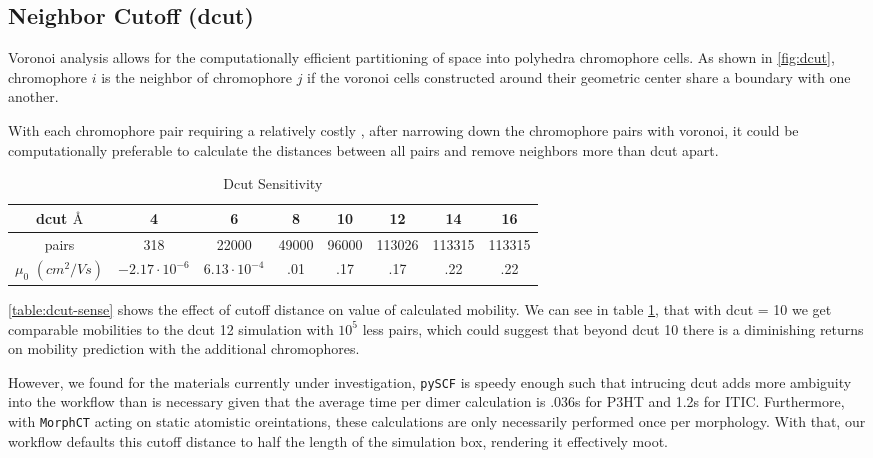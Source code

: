 \subsection{Neighbor Cutoff (dcut)}
\label{dcutresults}
Voronoi analysis allows for the computationally efficient partitioning of space into
polyhedra chromophore cells. As shown in \ref{fig:dcut}, chromophore $i$ is the neighbor of chromophore $j$
if the voronoi cells constructed around their geometric center
share a boundary with one another. 

With each chromophore pair requiring a relatively costly , after narrowing down the chromophore pairs with voronoi, it
could be
computationally preferable to calculate the distances between all pairs and remove neighbors more than dcut
apart.

\begin{table}
\caption{Dcut Sensitivity}
\centering %
\begin{tabular}{c c c c c c c c} %
\hline\hline %
    dcut $\text{\AA}$ & 4 & 6 & 8 & 10 & 12 & 14 & 16 \\ [0.5ex] %
\hline  %
pairs & 318 & 22000 & 49000 & 96000 & 113026 & 113315 & 113315 \\ [1ex]%
$\mu_{0}$ $(cm^{2}/Vs)$ & $-2.17 \cdot 10^{-6}$ & $6.13 \cdot 10^{-4}$ & .01 & .17 & .17 & .22 & .22 \\ [1ex] %
\hline %
\end{tabular}
\label{table:dcut-sense} %
\end{table}

\autoref{table:dcut-sense} shows the effect of cutoff distance on value of
calculated mobility.  
 We can see in table \ref{table:dcut-sense}, that with dcut = 10 we get comparable mobilities to the
dcut 12 simulation with $10^5$ less
pairs, which could suggest that beyond dcut 10 there is a diminishing returns on mobility prediction with the
additional chromophores. 

However, we found for the materials currently under investigation,
\texttt{pySCF} is speedy enough such that intrucing dcut adds more ambiguity
into the workflow than is necessary given that the average time per  dimer calculation is .036s for P3HT and
1.2s for ITIC. Furthermore, with \texttt{MorphCT} acting on static atomistic oreintations, these calculations 
are only necessarily performed once per morphology. With that, our workflow defaults this cutoff distance to half
the length of the simulation box, rendering it effectively moot. 


